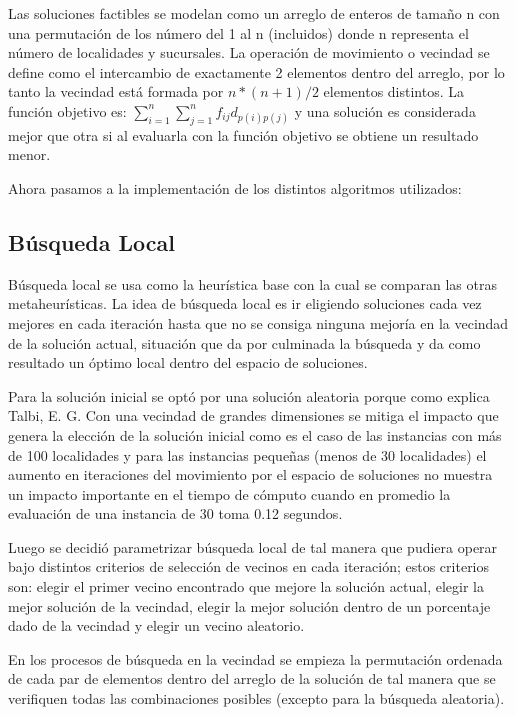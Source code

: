 \documentclass{ci5652}
\begin{document}
Las soluciones factibles se modelan como un arreglo de enteros de tamaño n con una permutación de los número del 1 al n (incluidos) donde n representa el número de localidades y sucursales. La operación de movimiento o vecindad se define como el intercambio de exactamente 2 elementos dentro del arreglo, por lo tanto la vecindad está formada por $n*(n+1)/2$ elementos distintos. La función objetivo es: $\sum_{i=1}^{n} \sum_{j=1}^{n} f_{ij} d_{p(i)p(j)}$  y una solución es considerada mejor que otra si al evaluarla con la función objetivo se obtiene un resultado menor. 

Ahora pasamos a la implementación de los distintos algoritmos utilizados:

\subsection{Búsqueda Local}

Búsqueda local se usa como la heurística base con la cual se comparan las otras metaheurísticas. La idea de búsqueda local es ir eligiendo soluciones cada vez mejores en cada iteración hasta que no se consiga ninguna mejoría en la vecindad de la solución actual, situación que da por culminada la búsqueda y da como resultado un óptimo local dentro del espacio de soluciones.

Para la solución inicial se optó por una solución aleatoria porque como explica Talbi, E. G. \cite{6} Con una vecindad de grandes dimensiones se mitiga el impacto que genera la elección de la solución inicial como es el caso de las instancias con más de 100 localidades y para las instancias pequeñas (menos de 30 localidades) el aumento en iteraciones del movimiento por el espacio de soluciones no muestra un impacto importante en el tiempo de cómputo cuando en promedio la evaluación de una instancia de 30 toma 0.12 segundos.

Luego se decidió parametrizar búsqueda local de tal manera que pudiera operar bajo distintos criterios de selección de vecinos en cada iteración; estos criterios son: elegir el primer vecino encontrado que mejore la solución actual, elegir la mejor solución de la vecindad, elegir la mejor solución dentro de un porcentaje dado de la vecindad y elegir un vecino aleatorio.

En los procesos de búsqueda en la vecindad se empieza la permutación ordenada de cada par de elementos dentro del arreglo de la solución de tal manera que se verifiquen todas las combinaciones posibles (excepto para la búsqueda aleatoria). 
\end{document}
